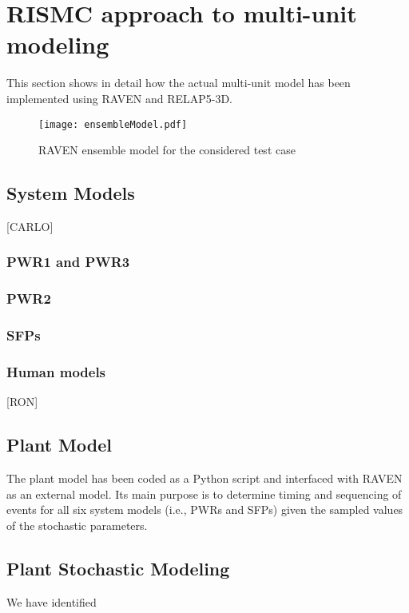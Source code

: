 \section{RISMC approach to multi-unit modeling}
\label{sec:RISMC_MU_modeling}

This section shows in detail how the actual multi-unit model has been implemented
using RAVEN and RELAP5-3D. 

\begin{figure}
    \centering
    \texttt{[image: ensembleModel.pdf]}
    \caption{RAVEN ensemble model for the considered test case}
    \label{fig:ensembleModel}
\end{figure}

\subsection{System Models}
[CARLO]
\subsubsection{PWR1 and PWR3}

\subsubsection{PWR2}

\subsubsection{SFPs}

\subsubsection{Human models}
[RON]

\subsection{Plant Model}
The plant model has been coded as a Python script and interfaced with RAVEN as an external model. Its
main purpose is to determine timing and sequencing of events for all six system models (i.e., PWRs and 
SFPs) given the sampled values of the stochastic parameters.

\subsection{Plant Stochastic Modeling}

We have identified 